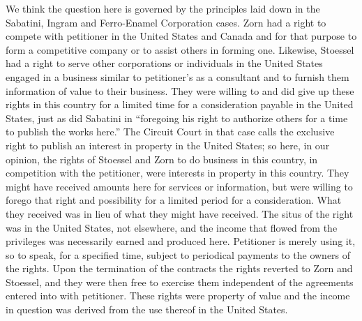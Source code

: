 \begin{select}


We think the question here is governed by the principles laid down in the Sabatini, Ingram and Ferro-Enamel Corporation cases. Zorn had a right to compete with petitioner in the United States and Canada and for that purpose to form a competitive company or to assist others in forming one. Likewise, Stoessel had a right to serve other corporations or individuals in the United States engaged in a business similar to petitioner's as a consultant and to furnish them information of value to their business. They were willing to and did give up these rights in this country for a limited time for a consideration payable in the United States, just as did Sabatini in ``foregoing his right to authorize others for a time to publish the works here.'' The Circuit Court in that case calls the exclusive right to publish an interest in property in the United States; so here, in our opinion, the rights of Stoessel and Zorn to do business in this country, in competition with the petitioner, were interests in property in this country. They might have received amounts here for services or information, but were willing to forego that right and possibility for a limited period for a consideration. What they received was in lieu of what they might have received. The situs of the right was in the United States, not elsewhere, and the income that flowed from the privileges was necessarily earned and produced here. Petitioner is merely using it, so to speak, for a specified time, subject to periodical payments to the owners of the rights. Upon the termination of the contracts the rights reverted to Zorn and Stoessel, and they were then free to exercise them independent of the agreements entered into with petitioner. These rights were property of value and the income in question was derived from the use thereof in the United States.


\end{select}
